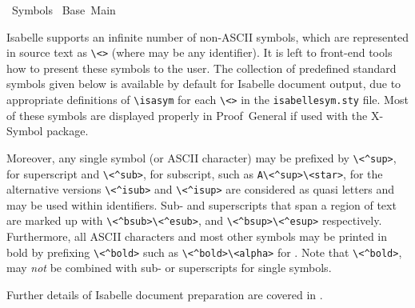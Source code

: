 %
\begin{isabellebody}%
\def\isabellecontext{Symbols}%
%
\isadelimtheory
%
\endisadelimtheory
%
\isatagtheory
{}\isamarkupfalse%
\ Symbols\isanewline
{}\ Base\ Main\isanewline
{}%
\endisatagtheory
{\isafoldtheory}%
%
\isadelimtheory
%
\endisadelimtheory
%
\isamarkuptrue%
%
\begin{isamarkuptext}%
Isabelle supports an infinite number of non-ASCII symbols, which are
  represented in source text as \verb|\|\verb|<|\verb|>| (where  may be any identifier).  It
  is left to front-end tools how to present these symbols to the user.
  The collection of predefined standard symbols given below is
  available by default for Isabelle document output, due to
  appropriate definitions of \verb|\|\verb|isasym| for each \verb|\|\verb|<|\verb|>| in the \verb|isabellesym.sty| file.  Most of these symbols
  are displayed properly in Proof~General if used with the X-Symbol
  package.

  Moreover, any single symbol (or ASCII character) may be prefixed by
  \verb|\|\verb|<^sup>|, for superscript and \verb|\|\verb|<^sub>|, for subscript, such as \verb|A\|\verb|<^sup>\<star>|, for  the alternative
  versions \verb|\|\verb|<^isub>| and \verb|\|\verb|<^isup>| are considered as quasi letters and may
  be used within identifiers.  Sub- and superscripts that span a
  region of text are marked up with \verb|\|\verb|<^bsub>|\verb|\|\verb|<^esub>|, and
  \verb|\|\verb|<^bsup>|\verb|\|\verb|<^esup>| respectively.  Furthermore, all ASCII
  characters and most other symbols may be printed in bold by
  prefixing \verb|\|\verb|<^bold>| such as \verb|\|\verb|<^bold>\|\verb|<alpha>| for .  Note that \verb|\|\verb|<^bold>|, may
  \emph{not} be combined with sub- or superscripts for single symbols.

  Further details of Isabelle document preparation are covered in
  .

  \begin{center}
  \begin{isabellebody}
    
  \end{isabellebody}
  \end{center}%
\end{isamarkuptext}%
\isamarkuptrue%
%
\isadelimtheory
%
\endisadelimtheory
%
\isatagtheory
{}\isamarkupfalse%
%
\endisatagtheory
{\isafoldtheory}%
%
\isadelimtheory
%
\endisadelimtheory
\end{isabellebody}%
